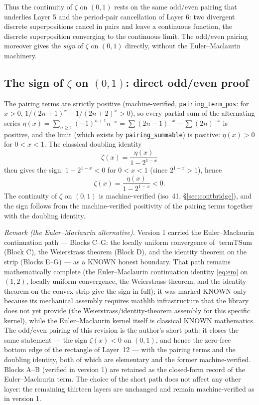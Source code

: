 \documentclass{article}
\newcommand{\zt}{\zeta}
\begin{document}
Thus the continuity of $\zt$ on $(0,1)$ rests on the same odd/even pairing
that underlies Layer 5 and the period-pair cancellation of Layer 6: two
divergent discrete superpositions cancel in pairs and leave a continuous
function, the discrete superposition converging to the continuous limit.
The odd/even pairing moreover gives the \emph{sign} of $\zt$ on $(0,1)$
directly, without the Euler--Maclaurin machinery.

\subsection{The sign of $\zt$ on $(0,1)$: direct odd/even proof}
\label{sec:blocksCG}

The pairing terms are strictly positive (machine-verified,
\texttt{pairing\_term\_pos}: for $x>0$,
$1/(2n+1)^x-1/(2n+2)^x>0$), so every partial sum of the alternating series
$\eta(x)=\sum_{n\ge1}(-1)^{n+1}n^{-x}=\sum(2n-1)^{-x}-\sum(2n)^{-x}$ is
positive, and the limit (which exists by \texttt{pairing\_summable}) is
positive: $\eta(x)>0$ for $0<x<1$. The classical doubling identity
\[
\zt(x)=\frac{\eta(x)}{1-2^{1-x}}
\]
then gives the sign: $1-2^{1-x}<0$ for $0<x<1$ (since $2^{1-x}>1$), hence
\[
\zt(x)=\frac{\eta(x)}{1-2^{1-x}}<0.
\]
The continuity of $\zt$ on $(0,1)$ is machine-verified (iso~41,
\S\ref{sec:contbridge}), and the sign follows from the machine-verified
positivity of the pairing terms together with the doubling identity.

\emph{Remark (the Euler--Maclaurin alternative).} Version 1 carried the
Euler--Maclaurin continuation path --- Blocks C--G: the locally uniform
convergence of $\operatorname{termTSum}$ (Block C), the Weierstrass theorem
(Block D), and the identity theorem on the strip (Blocks E--G) --- as a
KNOWN honest boundary. That path remains mathematically complete (the
Euler--Maclaurin continuation identity \eqref{eq:em} on $(1,2)$, locally
uniform convergence, the Weierstrass theorem, and the identity theorem on
the convex strip give the sign in full); it was marked KNOWN only because
its mechanical assembly requires mathlib infrastructure that the library
does not yet provide (the Weierstrass/identity-theorem assembly for this
specific kernel), while the Euler--Maclaurin kernel itself is classical
KNOWN mathematics. The odd/even pairing of this revision is the author's
short path: it closes the same statement --- the sign $\zt(x)<0$ on
$(0,1)$, and hence the zero-free bottom edge of the rectangle of
Layer~12 --- with the pairing terms and the doubling identity, both of
which are elementary and the former machine-verified. Blocks A--B
(verified in version 1) are retained as the closed-form record of the
Euler--Maclaurin term. The choice of the short path does not affect any
other layer: the remaining thirteen layers are unchanged and remain
machine-verified as in version 1.
\end{document}
